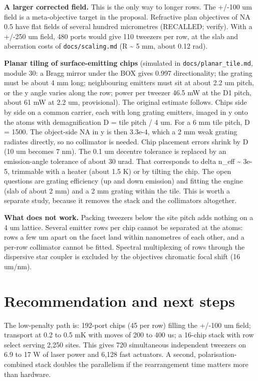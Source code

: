 \textbf{A larger corrected field.} This is the only way to longer rows.
The +/-100 um field is a meta-objective target in the proposal.
Refractive plan objectives of NA 0.5 have flat fields of several hundred
micrometres (RECALLED; verify). With a +/-250 um field, 480 ports would
give 110 tweezers per row, at the slab and aberration costs of
\texttt{docs/scaling.md} (R \textasciitilde{} 5 mm, about 0.12 rad).

\textbf{Planar tiling of surface-emitting chips} (simulated in
\texttt{docs/planar\_tile.md}, module 30: a Bragg mirror under the BOX
gives 0.997 directionality; the grating must be about 4 mm long;
neighbouring emitters must sit at about 2.2 um pitch, or the y angle
varies along the row; power per tweezer 46.5 mW at the D1 pitch, about
61 mW at 2.2 um, provisional). The original estimate follows. Chips side
by side on a common carrier, each with long grating emitters, imaged in
y onto the atoms with demagnification D = tile pitch / 4 um. For a 6 mm
tile pitch, D = 1500. The object-side NA in y is then 3.3e-4, which a 2
mm weak grating radiates directly, so no collimator is needed. Chip
placement errors shrink by D (10 um becomes 7 nm). The 0.1 um decentre
tolerance is replaced by an emission-angle tolerance of about 30 urad.
That corresponds to delta n\_eff \textasciitilde{} 3e-5, trimmable with
a heater (about 1.5 K) or by tilting the chip. The open questions are
grating efficiency (up and down emission) and fitting the engine (slab
of about 2 mm) and a 2 mm grating within the tile. This is worth a
separate study, because it removes the stack and the collimators
altogether.

\textbf{What does not work.} Packing tweezers below the site pitch adds
nothing on a 4 um lattice. Several emitter rows per chip cannot be
separated at the atoms: rows a few um apart on the facet land within
nanometres of each other, and a per-row collimator cannot be fitted.
Spectral multiplexing of rows through the dispersive star coupler is
excluded by the objective\textquotesingle s chromatic focal shift (16
um/nm).

\hypertarget{6-recommendation-and-next-steps}{%
\section{Recommendation and next
steps}\label{scaling_beyond-6-recommendation-and-next-steps}}

The low-penalty path is: 192-port chips (45 per row) filling the +/-100
um field; transport at 0.2 to 0.5 mK with moves of 200 to 400 us; a
16-chip stack with row select serving 2,250 sites. This gives 720
simultaneous independent tweezers on 6.9 to 17 W of laser power and
6,128 fast actuators. A second, polarisation-combined stack doubles the
parallelism if the rearrangement time matters more than hardware.


